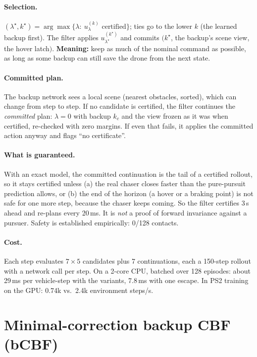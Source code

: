 \documentclass[11pt]{article}
\begin{document}
\paragraph{Selection.} $(\lambda^\star,k^\star)=\arg\max\{\lambda:\ u^{(k)}_\lambda\text{ certified}\}$; ties go to the lower $k$ (the learned backup first). The filter applies $u^{(k^\star)}_{\lambda^\star}$ and commits $(k^\star$, the backup's scene view, the hover latch$)$.
\textbf{Meaning:} keep as much of the nominal command as possible, as long as some backup can still save the drone from the next state.

\paragraph{Committed plan.} The backup network sees a local scene (nearest obstacles, sorted), which can change from step to step. If no candidate is certified, the filter continues the \emph{committed} plan: $\lambda=0$ with backup $k_c$ and the view frozen as it was when certified, re-checked with zero margins. If even that fails, it applies the committed action anyway and flags ``no certificate''.

\paragraph{What is guaranteed.} With an exact model, the committed continuation is the tail of a certified rollout, so it stays certified unless (a) the real chaser closes faster than the pure-pursuit prediction allows, or (b) the end of the horizon (a hover or a braking point) is not safe for one more step, because the chaser keeps coming.
So the filter certifies 3\,s ahead and re-plans every 20\,ms. It is \emph{not} a proof of forward invariance against a pursuer. Safety is established empirically: 0/128 contacts.

\paragraph{Cost.} Each step evaluates $7\times5$ candidates plus 7 continuations, each a 150-step rollout with a network call per step.
On a 2-core CPU, batched over 128 episodes: about 29\,ms per vehicle-step with the variants, 7.8\,ms with one escape.
In PS2 training on the GPU: 0.74k vs.\ 2.4k environment steps/s.

\section{Minimal-correction backup CBF (bCBF)}\label{sec:bcbf}
\end{document}
